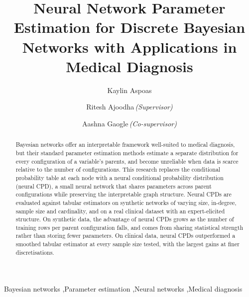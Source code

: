 \documentclass[a4paper,fleqn]{cas-dc}
\begin{document}
\let\WriteBookmarks\relax

\renewcommand{\textfraction}{.3}
\renewcommand{\topfraction}{.70}
\renewcommand{\bottomfraction}{.50}
\renewcommand{\floatpagefraction}{.60}
\renewcommand{\dbltopfraction}{.60}
\renewcommand{\dblfloatpagefraction}{.60}


\title [mode = title]{Neural Network Parameter Estimation for Discrete Bayesian Networks with Applications in Medical Diagnosis}



\author[1]{Kaylin Aspoas}
\author[1]{Ritesh Ajoodha\,\textnormal{\itshape (Supervisor)}}
\author[1]{Aashna Gaogle\,\textnormal{\itshape (Co-supervisor)}}



\begin{abstract}
Bayesian networks offer an interpretable framework well-suited to medical diagnosis, but their standard parameter estimation methods estimate a separate distribution for every configuration of a variable's parents, and become unreliable when data is scarce relative to the number of configurations. This research replaces the conditional probability table at each node with a neural conditional probability distribution (neural CPD), a small neural network that shares parameters across parent configurations while preserving the interpretable graph structure. Neural CPDs are evaluated against tabular estimators on synthetic networks of varying size, in-degree, sample size and cardinality, and on a real clinical dataset with an expert-elicited structure. On synthetic data, the advantage of neural CPDs grows as the number of training rows per parent configuration falls, and comes from sharing statistical strength rather than storing fewer parameters. On clinical data, neural CPDs outperformed a smoothed tabular estimator at every sample size tested, with the largest gains at finer discretisations.
\end{abstract}

\begin{keywords}
Bayesian networks \sep Parameter estimation \sep Neural networks \sep Medical diagnosis
\end{keywords}
\end{document}
